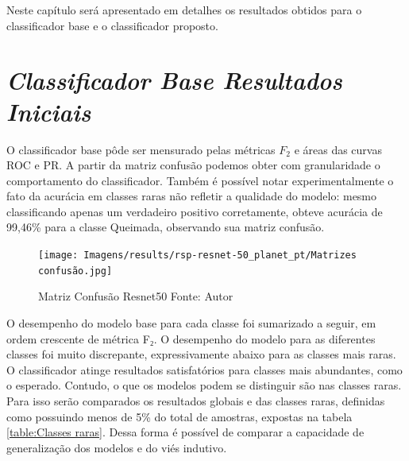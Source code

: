 
Neste capítulo será apresentado em detalhes os resultados obtidos para o classificador base e o classificador proposto.

\section{\textit{Classificador Base Resultados Iniciais}}\label{sec:Cap4_ResultadosPreliminares}


O classificador base pôde ser mensurado pelas métricas $F_2$ e áreas das curvas ROC e PR. A partir da matriz confusão podemos obter com granularidade o comportamento do classificador. Também é possível notar experimentalmente o fato da acurácia em classes raras não refletir a qualidade do modelo: mesmo classificando apenas um verdadeiro positivo corretamente, obteve acurácia de 99,46\% para a classe Queimada, observando sua matriz confusão.

\begin{figure}[!ht]
    \centering
    \texttt{[image: Imagens/results/rsp-resnet-50\_planet\_pt/Matrizes confusão.jpg]}
    \caption{ Matriz Confusão Resnet50
    Fonte: Autor}
    \label{fig:Matriz Confusao Resnet50}
\end{figure} 


O desempenho do modelo base para cada classe foi sumarizado a seguir, em ordem crescente de métrica F₂. O desempenho do modelo para as diferentes classes foi muito discrepante, expressivamente abaixo para as classes mais raras. O classificador atinge resultados satisfatórios para classes mais abundantes, como o esperado. Contudo, o que os modelos podem se distinguir são nas classes raras. Para isso serão comparados os resultados globais e das classes raras, definidas como possuindo menos de 5\% do total de amostras, expostas na tabela \ref{table:Classes raras}. Dessa forma é possível de comparar a capacidade de generalização dos modelos e do viés indutivo.

